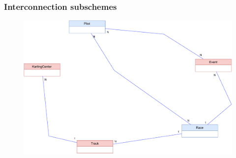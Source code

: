 \documentclass{beamer}
\begin{document}
\begin{frame}
    \frametitle{Interconnection subschemes}
    \begin{figure}
        \centering
        \includegraphics[width=1\linewidth]{drawio/interconnection-subschemes-cropped.pdf}
    \end{figure}
\end{frame}
\end{document}
